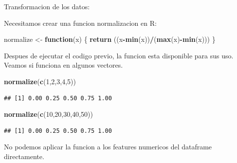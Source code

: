 \documentclass[ignorenonframetext,]{beamer}
\newenvironment{Shaded}{\begin{snugshade}}{\end{snugshade}}
\newcommand{\KeywordTok}[1]{\textcolor[rgb]{0.13,0.29,0.53}{\textbf{#1}}}
\newcommand{\DecValTok}[1]{\textcolor[rgb]{0.00,0.00,0.81}{#1}}
\newcommand{\StringTok}[1]{\textcolor[rgb]{0.31,0.60,0.02}{#1}}
\newcommand{\ControlFlowTok}[1]{\textcolor[rgb]{0.13,0.29,0.53}{\textbf{#1}}}
\newcommand{\OperatorTok}[1]{\textcolor[rgb]{0.81,0.36,0.00}{\textbf{#1}}}
\newcommand{\NormalTok}[1]{#1}
\begin{document}
\begin{frame}[fragile]

\begin{block}{Transformacion de los datos:}

Necesitamos crear una funcion normalizacion en R:

\begin{Shaded}
\begin{Highlighting}[]
\NormalTok{normalize <-}\StringTok{ }\ControlFlowTok{function}\NormalTok{(x) \{}
  \KeywordTok{return}\NormalTok{ ((x}\OperatorTok{-}\KeywordTok{min}\NormalTok{(x))}\OperatorTok{/}\NormalTok{(}\KeywordTok{max}\NormalTok{(x)}\OperatorTok{-}\KeywordTok{min}\NormalTok{(x)))}
\NormalTok{\}}
\end{Highlighting}
\end{Shaded}

Despues de ejecutar el codigo previo, la funcion esta disponible para
sus uso. Veamos si funciona en algunos vectores.

\begin{Shaded}
\begin{Highlighting}[]
\KeywordTok{normalize}\NormalTok{(}\KeywordTok{c}\NormalTok{(}\DecValTok{1}\NormalTok{,}\DecValTok{2}\NormalTok{,}\DecValTok{3}\NormalTok{,}\DecValTok{4}\NormalTok{,}\DecValTok{5}\NormalTok{))}
\end{Highlighting}
\end{Shaded}

\begin{verbatim}
## [1] 0.00 0.25 0.50 0.75 1.00
\end{verbatim}

\begin{Shaded}
\begin{Highlighting}[]
\KeywordTok{normalize}\NormalTok{(}\KeywordTok{c}\NormalTok{(}\DecValTok{10}\NormalTok{,}\DecValTok{20}\NormalTok{,}\DecValTok{30}\NormalTok{,}\DecValTok{40}\NormalTok{,}\DecValTok{50}\NormalTok{))}
\end{Highlighting}
\end{Shaded}

\begin{verbatim}
## [1] 0.00 0.25 0.50 0.75 1.00
\end{verbatim}

No podemos aplicar la funcion a los features numericos del dataframe
directamente.

\end{block}

\end{frame}
\end{document}
